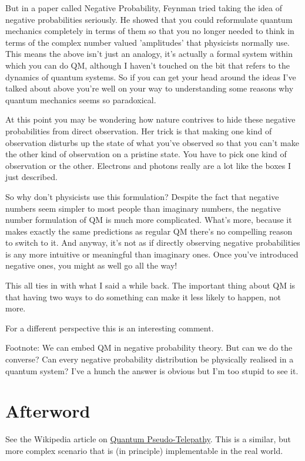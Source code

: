 \documentclass[12pt]{article}
\begin{document}
But in a paper called Negative Probability, Feynman tried taking the idea of negative probabilities seriously. He showed that you could reformulate quantum mechanics completely in terms of them so that you no longer needed to think in terms of the complex number valued 'amplitudes' that physicists normally use. This means the above isn't just an analogy, it's actually a formal system within which you can do QM, although I haven't touched on the bit that refers to the dynamics of quantum systems. So if you can get your head around the ideas I've talked about above you're well on your way to understanding some reasons why quantum mechanics seems so paradoxical.

At this point you may be wondering how nature contrives to hide these negative probabilities from direct observation. Her trick is that making one kind of observation disturbs up the state of what you've observed so that you can't make the other kind of observation on a pristine state. You have to pick one kind of observation or the other. Electrons and photons really are a lot like the boxes I just described.

So why don't physicists use this formulation? Despite the fact that negative numbers seem simpler to most people than imaginary numbers, the negative number formulation of QM is much more complicated. What's more, because it makes exactly the same predictions as regular QM there's no compelling reason to switch to it. And anyway, it's not as if directly observing negative probabilities is any more intuitive or meaningful than imaginary ones. Once you've introduced negative ones, you might as well go all the way!

This all ties in with what I said a while back. The important thing about QM is that having two ways to do something can make it less likely to happen, not more.

For a different perspective this is an interesting comment.

Footnote: We can embed QM in negative probability theory. But can we do the converse? Can every negative probability distribution be physically realised in a quantum system? I've a hunch the answer is obvious but I'm too stupid to see it.

\section{Afterword}
See the Wikipedia article on \href{https://en.wikipedia.org/wiki/Quantum_pseudo-telepathy}{Quantum Pseudo-Telepathy}. This is a similar, but more complex scenario that is (in principle) implementable in the real world.
\end{document}

